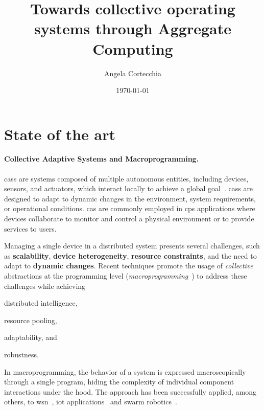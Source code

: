 \documentclass[12pt, a4paper]{article}
\newenvironment{inlinelist}{\begin{enumerate*}[label=\emph{(\roman*)}]}{\end{enumerate*}}
\begin{document}
\title{Towards collective operating systems through Aggregate Computing}

\author{Angela Cortecchia}
\date{\today}
\maketitle


\section{State of the art}
\label{sec:state-of-the-art}

\sloppypar
\paragraph{Collective Adaptive Systems and Macroprogramming.}
\acp{cas} are systems composed of multiple autonomous entities,
including devices, sensors, and actuators, which interact locally to achieve a global goal~\cite{ferscha2015}.
%
\acp{cas} are designed to adapt to dynamic changes in the environment, system requirements, or operational conditions.
%
\ac{cas} are commonly employed in \ac{cps} applications where devices collaborate to monitor and control a
physical environment or to provide services to users.

Managing a single device in a distributed system presents several challenges,
such as \textbf{scalability}, \textbf{device heterogeneity},
\textbf{resource constraints}, and the need to adapt to \textbf{dynamic changes}.
%
Recent techniques promote the usage of \emph{collective} abstractions at the programming level
(\emph{macroprogramming}~\cite{casadei22}) to address these challenges while achieving
\begin{inlinelist}
    \item distributed intelligence,
    \item resource pooling,
    \item adaptability, and
    \item robustness.
\end{inlinelist}
%
In macroprogramming, the behavior of a system is expressed macroscopically through a single program,
hiding the complexity of individual component interactions under the hood.
%
The approach has been successfully applied, among others, to
\ac{wsn}~\cite{1440891},
\ac{iot} applications~\cite{noor19,mizzi18}
and
swarm robotics~\cite{buzz}.
\end{document}

